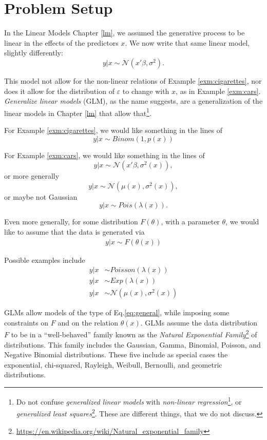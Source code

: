 \documentclass[]{book}
\renewcommand{\href}[2]{#2\footnote{\url{#1}}}
\theoremstyle{definition}
\theoremstyle{definition}
\theoremstyle{definition}
\theoremstyle{remark}
\begin{document}
\hypertarget{problem-setup-1}{%
\section{Problem Setup}\label{problem-setup-1}}

In the Linear Models Chapter \ref{lm}, we assumed the generative process to be linear in the effects of the predictors \(x\).
We now write that same linear model, slightly differently:
\[
 y|x \sim \mathcal{N}(x'\beta, \sigma^2).
\]

This model not allow for the non-linear relations of Example \ref{exm:cigarettes}, nor does it allow for the distribution of \(\varepsilon\) to change with \(x\), as in Example \ref{exm:cars}.
\emph{Generalize linear models} (GLM), as the name suggests, are a generalization of the linear models in Chapter \ref{lm} that allow that\footnote{Do not confuse \emph{generalized linear models} with \href{https://en.wikipedia.org/wiki/Nonlinear_regression}{\emph{non-linear regression}}, or \href{https://en.wikipedia.org/wiki/Generalized_least_squares}{\emph{generalized least squares}}.
  These are different things, that we do not discuss.}.

For Example \ref{exm:cigarettes}, we would like something in the lines of
\[
 y|x \sim Binom(1,p(x))
\]

For Example \ref{exm:cars}, we would like something in the lines of
\[
 y|x \sim \mathcal{N}(x'\beta,\sigma^2(x)),
\]
or more generally
\[
 y|x \sim \mathcal{N}(\mu(x),\sigma^2(x)),
\]
or maybe not Gaussian
\[
 y|x \sim Pois(\lambda(x)).
\]

Even more generally, for some distribution \(F(\theta)\), with a parameter \(\theta\), we would like to assume that the data is generated via
\begin{align}
  \label{eq:general}
  y|x \sim F(\theta(x))
\end{align}

Possible examples include
\begin{align}
 y|x &\sim Poisson(\lambda(x)) \\
 y|x &\sim Exp(\lambda(x)) \\
 y|x &\sim \mathcal{N}(\mu(x),\sigma^2(x)) 
\end{align}

GLMs allow models of the type of Eq.\eqref{eq:general}, while imposing some constraints on \(F\) and on the relation \(\theta(x)\).
GLMs assume the data distribution \(F\) to be in a ``well-behaved'' family known as the \href{https://en.wikipedia.org/wiki/Natural_exponential_family}{\emph{Natural Exponential Family}} of distributions.
This family includes the Gaussian, Gamma, Binomial, Poisson, and Negative Binomial distributions.
These five include as special cases the exponential, chi-squared, Rayleigh, Weibull, Bernoulli, and geometric distributions.
\end{document}
